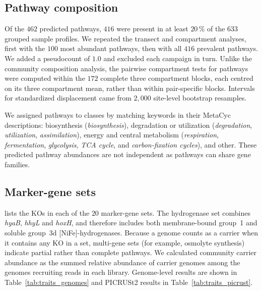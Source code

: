\documentclass[11pt]{article}
\begin{document}
\subsection{Pathway composition}\label{sup:function_pathways}
Of the $462$ predicted pathways, $416$ were present in at least $20\,\%$ of the $633$ grouped sample profiles. We repeated the transect and compartment analyses, first with the $100$ most abundant pathways, then with all $416$ prevalent pathways. We added a pseudocount of $1.0$ and excluded each campaign in turn. Unlike the community composition analysis, the pairwise compartment tests for pathways were computed within the $172$ complete three compartment blocks, each centred on its three compartment mean, rather than within pair-specific blocks. Intervals for standardized displacement came from $2{,}000$ site-level bootstrap resamples.

We assigned pathways to classes by matching keywords in their MetaCyc descriptions: biosynthesis (\textit{biosynthesis}), degradation or utilization (\textit{degradation}, \textit{utilization}, \textit{assimilation}), energy and central metabolism (\textit{respiration}, \textit{fermentation}, \textit{glycolysis}, \textit{TCA cycle}, and \textit{carbon-fixation cycles}), and other. These predicted pathway abundances are not independent as pathways can share gene families.

\subsection{Marker-gene sets}\label{sup:function_traits}
 lists the KOs in each of the $20$ marker-gene sets. The hydrogenase set combines \textit{hyaB}, \textit{hhyL} and \textit{hoxH}, and therefore includes both membrane-bound group~1 and soluble group~3d [NiFe]-hydrogenases. Because a genome counts as a carrier when it contains any KO in a set, multi-gene sets (for example, osmolyte synthesis) indicate partial rather than complete pathways. We calculated community carrier abundance as the summed relative abundance of carrier genomes among the genomes recruiting reads in each library. Genome-level results are shown in Table~\ref{tab:traits_genomes} and PICRUSt2 results in Table~\ref{tab:traits_picrust}.





\clearpage


\end{document}
